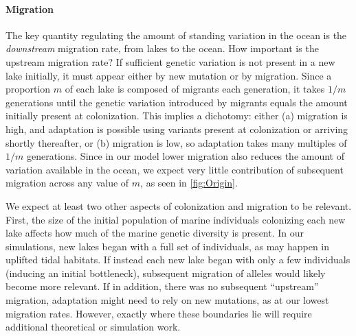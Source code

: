 \documentclass{article}
\begin{document}
\paragraph{Migration}
The key quantity regulating the amount of standing variation in the ocean is the \emph{downstream} migration rate, from lakes to the ocean. 
How important is the upstream migration rate?
If sufficient genetic variation is not present in a new lake initially, it must appear either by new mutation or by migration. 
Since a proportion $m$ of each lake is composed of migrants each generation, 
it takes $1/m$ generations until the genetic variation introduced by migrants equals the amount initially present at colonization. 
This implies a dichotomy: either 
(a) migration is high, and adaptation is possible using variants present at colonization or arriving shortly thereafter, or 
(b) migration is low, so adaptation takes many multiples of $1/m$ generations. 
Since in our model lower migration also reduces the amount of variation available in the ocean, 
we expect very little contribution of subsequent migration across any value of $m$, as seen in \autoref{fig:Origin}.

We expect at least two other aspects of colonization and migration to be relevant.
First, the size of the initial population of marine individuals colonizing each new lake
affects how much of the marine genetic diversity is present. 
In our simulations, new lakes began with a full set of individuals,
as may happen in uplifted tidal habitats.
If instead each new lake began with only a few individuals (inducing an initial bottleneck),
subsequent migration of alleles would likely become more relevant.
If in addition, there was no subsequent ``upstream'' migration,
adaptation might need to rely on new mutations, as at our lowest migration rates.
However, exactly where these boundaries lie will require additional theoretical or simulation work.
\end{document}
